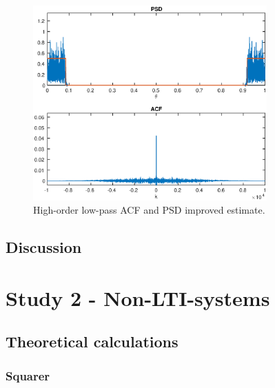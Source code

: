 \documentclass[a4paper,12pt]{article}
\begin{document}
\begin{figure}[h]
\centering
\includegraphics[width=0.8\textwidth]{bilder/Lab1/Lab1fig10.eps}
\caption{High-order low-pass ACF and PSD improved estimate.}
\label{fig:Lab1fig10}
\end{figure}



\subsection{Discussion}



\section{Study 2 - Non-LTI-systems}



\subsection{Theoretical calculations}

\subsubsection{Squarer}
\end{document}
